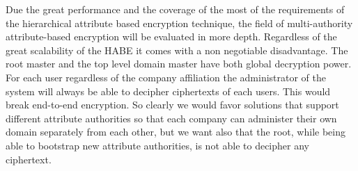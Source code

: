 Due the great performance and the coverage of the most of the requirements of the hierarchical attribute based encryption technique, the field of multi-authority attribute-based encryption will be evaluated in more depth. Regardless of the great scalability of the \ac{HABE} it comes with a non negotiable disadvantage. The root master and the top level domain master have both global decryption power. For each user regardless of the company affiliation the administrator of the system will always be able to decipher ciphertexts of each users. This would break end-to-end encryption. So clearly we would favor solutions that support different attribute authorities so that each company can administer their own domain separately from each other, but we want also that the root, while being able to bootstrap new attribute authorities, is not able to decipher any ciphertext. 